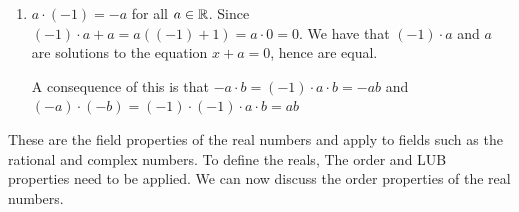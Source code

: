 \begin{enumerate}
    From this, we can define the rules of the fraction;
    \begin{align*}
        \frac{ac}{bc} &= ac (bc)^{-1} = ab^{-1} c c^{-1} = ab^{-1} = \frac{a}{b} \\
        \frac{a}{b} \cdot \frac{c}{d} &= ab^{-1} c d^{-1} =ac (bd)^{-1} = \frac{ac}{bd} \\
        \frac{a}{b} + \frac{c}{d} &= ab^{-1} + cd^{-1} =ab^{-1}d d^{-1} + c b b^{-1} d^{-1} \\
        &= (ad + cb) \cdot (b^{-1} d^{-1}) = \frac{ad + cb}{bd}
    \end{align*}
    \item $a \cdot (-1) = -a$ for all $a\in \mathbb{R}$. Since $(-1) \cdot a + a = a((-1) + 1) = a \cdot 0 = 0$. We have that $(-1) \cdot a$ and $a$ are solutions to the equation $x + a = 0$, hence are equal. 
    
    A consequence of this is that $-a \cdot b = (-1) \cdot a \cdot b = -ab$ and $(-a) \cdot (-b) = (-1) \cdot (-1)\cdot  a\cdot b = ab$
\end{enumerate}

These are the field properties of the real numbers and apply to fields such as the rational and complex numbers. To define the reals, The order and LUB properties need to be applied. We can now discuss the order properties of the real numbers. 

